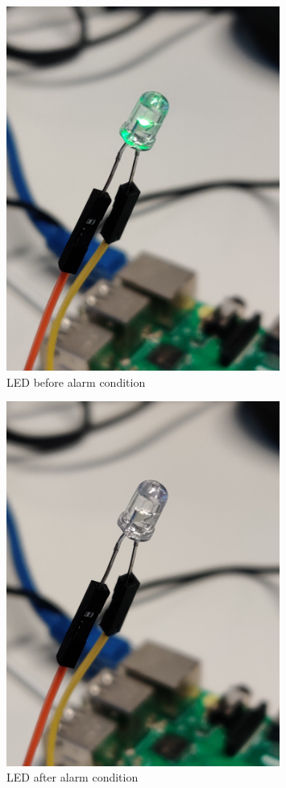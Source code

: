 \begin{figure}[H]
	\centering
	\includegraphics[width=0.8\textwidth]{images/ledOn}
	\caption{LED before alarm condition}
	\label{fig:images-ledOn}
\end{figure}

\begin{figure}[H]
	\centering
	\includegraphics[width=0.8\textwidth]{images/ledOff}
	\caption{LED after alarm condition}
	\label{fig:images-ledOff}
\end{figure}

